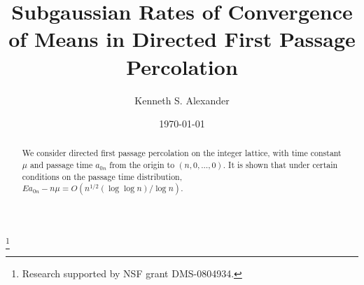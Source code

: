 \documentclass[12pt]{amsart}
\theoremstyle{plain}
\theoremstyle{definition}
\numberwithin{equation}{section}
\begin{document}
\newcommand{\ZZ}{\mathbb{Z}}
\newcommand{\ZZd}{\mathbb{Z}^{d}}
\newcommand{\RR}{\mathbb{R}}
\newcommand{\RRd}{\mathbb{R}^{d}}
\newcommand{\PP}{\mathbb{P}}
\newcommand{\QQ}{\mathbb{Q}}
\newcommand{\EE}{\mathbb{E}}
\newcommand{\BB}{\mathbb{B}}
\newcommand{\mA}{\mathcal{A}}
\newcommand{\mB}{\mathcal{B}}
\newcommand{\mC}{\mathcal{C}}
\newcommand{\mD}{\mathcal{D}}
\newcommand{\mE}{\mathcal{E}}
\newcommand{\mF}{\mathcal{F}}
\newcommand{\mG}{\mathcal{G}}
\newcommand{\mI}{\mathcal{I}}
\newcommand{\mJ}{\mathcal{J}}
\newcommand{\mL}{\mathcal{L}}
\newcommand{\mkN}{\mathfrak{N}}
\newcommand{\mR}{\mathcal{R}}
\newcommand{\mS}{\mathcal{S}}
\newcommand{\mT}{\mathcal{T}}
\newcommand{\mU}{\mathcal{U}}
\newcommand{\mV}{\mathcal{V}}
\newcommand{\mW}{\mathcal{W}}
\newcommand{\bks}{\backslash}
\newcommand{\half}{\frac{1}{2}}
\newcommand{\fN}{\frac{1}{N}}
\newcommand{\tZ}{\tilde{Z}}
\newcommand{\tJ}{J_1}
\newcommand{\tK}{\tilde{K}}
\newcommand{\tf}{\tilde{f}}
\newcommand{\tE}{\tilde{E}}
\newcommand{\tL}{\tilde{L}}
\newcommand{\tP}{\tilde{P}}
\newcommand{\tS}{\tilde{\tau}}
\newcommand{\tG}{\tilde{\Gamma}}
\newcommand{\hd}{\hat{\delta}}
\newcommand{\hP}{\hat{P}}
\newcommand{\hQ}{\hat{Q}}
\newcommand{\hZ}{\hat{Z}}
\newcommand{\hH}{\hat{H}}
\newcommand{\hm}{\hat{\mu}}
\newcommand{\ophi}{\overline{\varphi}}
\newcommand{\olm}{\overline{m}}
\newcommand{\tphi}{\tilde{\varphi}}
\newcommand{\oF}{\overline{F}}
\newcommand{\bx}{\mathbf{x}}
\newcommand{\bV}{\mathbf{V}}
\newcommand{\by}{\mathbf{y}}
\newcommand{\bs}{\mathbf{s}}
\newcommand{\bS}{\mathbf{S}}
\newcommand{\bbL}{\mathbb{L}}
\newcommand{\ep}{\epsilon}
\newcommand{\hp}{\hat{\varphi}}

\title[Subgaussian Rates of Convergence in FPP]
{Subgaussian Rates of Convergence of Means in Directed First Passage Percolation}
\author{Kenneth S. Alexander}
\address{Department of Mathematics KAP 108\\
University of Southern California\\
Los Angeles, CA  90089-2532 USA}
\thanks{Research supported by NSF grant DMS-0804934.}

\date{\today}

\begin{abstract}
We consider directed first passage percolation on the integer lattice, with time constant $\mu$ and passage time $a_{0n}$ from the origin to $(n,0,\dots,0)$.  It is shown that under certain conditions on the passage time distribution, $Ea_{0n} - n\mu = O(n^{1/2}(\log\log n)/\log n)$.
\end{abstract}
\maketitle
\end{document}
